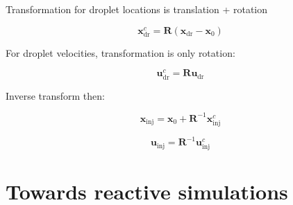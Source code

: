 Transformation for droplet locations is translation + rotation

\begin{equation}
\boldsymbol{x}^c_\mathrm{dr} = \boldsymbol{R} \left( \boldsymbol{x}_\mathrm{dr} -  \boldsymbol{x}_0 \right)
\end{equation}

For droplet velocities, transformation is only rotation:

\begin{equation}
\boldsymbol{u}^c_\mathrm{dr} = \boldsymbol{R} \boldsymbol{u}_\mathrm{dr}
\end{equation}

Inverse transform then:

\begin{equation}
\boldsymbol{x}_\mathrm{inj} = \boldsymbol{x}_0 + \boldsymbol{R}^{-1} \boldsymbol{x}_\mathrm{inj}^c
\end{equation}

\begin{equation}
\boldsymbol{u}_\mathrm{inj} = \boldsymbol{R}^{-1} \boldsymbol{u}_\mathrm{inj}^c
\end{equation}

\section{Towards reactive simulations}


